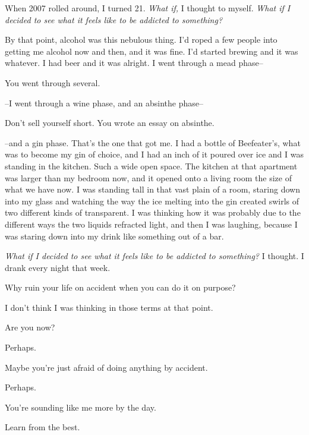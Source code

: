 \noindent When 2007 rolled around, I turned 21. \emph{What if,} I thought to myself. \emph{What if I decided to see what it feels like to be addicted to something?}

By that point, alcohol was this nebulous thing. I'd roped a few people into getting me alcohol now and then, and it was fine. I'd started brewing and it was whatever. I had beer and it was alright. I went through a mead phase--

\begin{ally}
You went through several.
\end{ally}
--I went through a wine phase, and an absinthe phase--

\begin{ally}
Don't sell yourself short. You wrote an essay on absinthe.
\end{ally}
--and a gin phase. That's the one that got me. I had a bottle of Beefeater's, what was to become my gin of choice, and I had an inch of it poured over ice and I was standing in the kitchen. Such a wide open space. The kitchen at that apartment was larger than my bedroom now, and it opened onto a living room the size of what we have now. I was standing tall in that vast plain of a room, staring down into my glass and watching the way the ice melting into the gin created swirls of two different kinds of transparent. I was thinking how it was probably due to the different ways the two liquids refracted light, and then I was laughing, because I was staring down into my drink like something out of a bar.

\emph{What if I decided to see what it feels like to be addicted to something?} I thought. I drank every night that week.

\begin{ally}
Why ruin your life on accident when you can do it on purpose?
\end{ally}
I don't think I was thinking in those terms at that point.

\begin{ally}
Are you now?
\end{ally}
Perhaps.

\begin{ally}
Maybe you're just afraid of doing anything by accident.
\end{ally}
Perhaps.

\begin{ally}
You're sounding like me more by the day.
\end{ally}
Learn from the best.

